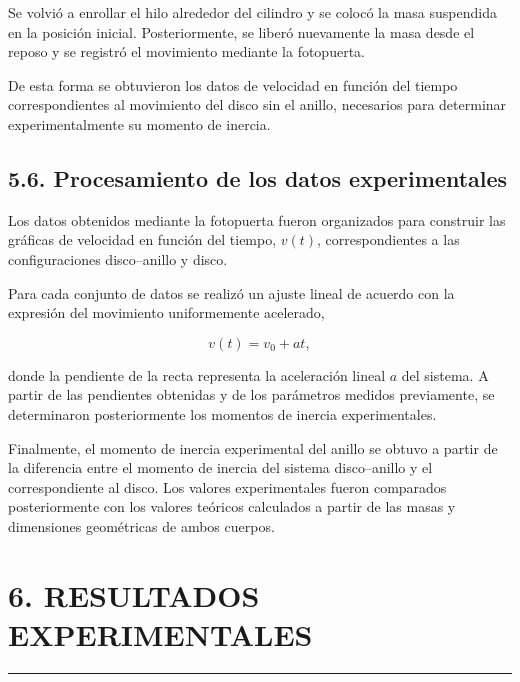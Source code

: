 \documentclass[11pt,a4paper]{article}
\newcommand{\sectionline}{%
    \vspace{-0.6em}
    \noindent\rule{\textwidth}{0.5pt}
    \vspace{0.5em}
}
\begin{document}
Se volvió a enrollar el hilo alrededor del cilindro y se colocó la masa
suspendida en la posición inicial. Posteriormente, se liberó nuevamente
la masa desde el reposo y se registró el movimiento mediante la
fotopuerta.

De esta forma se obtuvieron los datos de velocidad en función del tiempo
correspondientes al movimiento del disco sin el anillo, necesarios para
determinar experimentalmente su momento de inercia.



\subsection*{5.6. Procesamiento de los datos experimentales}

Los datos obtenidos mediante la fotopuerta fueron organizados para
construir las gráficas de velocidad en función del tiempo,
\(v(t)\), correspondientes a las configuraciones disco--anillo y disco.

Para cada conjunto de datos se realizó un ajuste lineal de acuerdo con
la expresión del movimiento uniformemente acelerado,

\[
v(t)=v_0+at,
\]

donde la pendiente de la recta representa la aceleración lineal \(a\)
del sistema. A partir de las pendientes obtenidas y de los parámetros
medidos previamente, se determinaron posteriormente los momentos de
inercia experimentales.

Finalmente, el momento de inercia experimental del anillo se obtuvo a
partir de la diferencia entre el momento de inercia del sistema
disco--anillo y el correspondiente al disco. Los valores experimentales
fueron comparados posteriormente con los valores teóricos calculados a
partir de las masas y dimensiones geométricas de ambos cuerpos.


\newpage

\section*{6. RESULTADOS EXPERIMENTALES}
\sectionline
\end{document}
